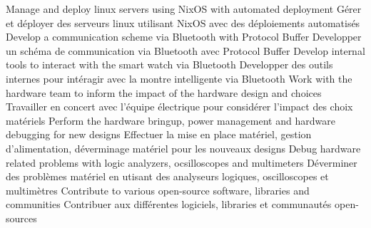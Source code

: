                 \resumeItemEnFr
                    {Manage and deploy linux servers using NixOS with automated deployment}
                    {Gérer et déployer des serveurs linux utilisant NixOS avec des déploiements automatisés}
                \resumeItemEnFr
                    {Develop a communication scheme via Bluetooth with Protocol Buffer}
                    {Developper un schéma de communication via Bluetooth avec Protocol Buffer}
                \resumeItemEnFr
                    {Develop internal tools to interact with the smart watch via Bluetooth}
                    {Developper des outils internes pour intéragir avec la montre intelligente via Bluetooth}
                \resumeItemEnFr
                    {Work with the hardware team to inform the impact of the hardware design and choices}
                    {Travailler en concert avec l'équipe électrique pour considérer l'impact des choix matériels}
                \resumeItemEnFr
                    {Perform the hardware bringup, power management and hardware debugging for new designs}
                    {Effectuer la mise en place matériel, gestion d'alimentation, déverminage matériel pour les nouveaux designs}
                \resumeItemEnFr
                    {Debug hardware related problems with logic analyzers, ocsilloscopes and multimeters}
                    {Déverminer des problèmes matériel en utisant des analyseurs logiques, oscilloscopes et multimètres}
                \resumeItemEnFr
                    {Contribute to various open-source software, libraries and communities}
                    {Contribuer aux différentes logiciels, libraries et communautés open-sources}
            \resumeItemListEnd
    \resumeSubHeadingListEnd

